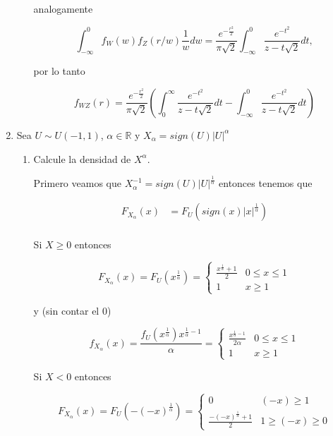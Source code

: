 \documentclass[letterpaper]{article}
\theoremstyle{definition}
\theoremstyle{lemathm}
\theoremstyle{lemademthm}
\newcommand{\R}{\mathbb{R}}
\begin{document}
\begin{enumerate}
\begin{enumerate}
			analogamente

			\[\int_{-\infty}^0 f_W(w)f_Z(r/w)\frac{1}{w}dw = \frac{e^{-\frac{r^2}{2}}}{\pi\sqrt{2}} \int_{-\infty}^0 \frac{e^{-t^2}}{z-t\sqrt{2}}dt,\]

			por lo tanto

			\[f_{WZ}(r) = \frac{e^{-\frac{r^2}{2}}}{\pi\sqrt{2}} \left( \int_{0}^{\infty} \frac{e^{-t^2}}{z-t\sqrt{2}}dt - \int_{-\infty}^0 \frac{e^{-t^2}}{z-t\sqrt{2}}dt \right)\]
		\end{enumerate}

		\item Sea $U \sim U(-1,1)$, $\alpha \in \R$ y $X_\alpha = sign(U)|U|^\alpha$
		
		\begin{enumerate}
			\item Calcule la densidad de $X^\alpha$.
			
			Primero veamos que $X_\alpha^{-1} = sign(U)|U|^{\frac{1}{\alpha}}$ entonces tenemos que

			\begin{align*}
				F_{X_\alpha}(x) &= F_U(sign(x)|x|^{\frac{1}{\alpha}}) \\
			\end{align*}

			Si $X \geq 0$ entonces
			
			\[F_{X_\alpha}(x) = F_U(x^{\frac{1}{\alpha}}) = \left\{\begin{array}{cc}
		
				\frac{x^{\frac{1}{\alpha}} + 1}{2} & 0 \leq x \leq 1\\
				1 & x \geq 1 
			
			\end{array}\right.\]

			y (sin contar el 0)

			\[f_{X_\alpha}(x) = \frac{f_U(x^{\frac{1}{\alpha}})x^{\frac{1}{\alpha}-1}}{\alpha} = \left\{\begin{array}{cc}
	
				\frac{x^{\frac{1}{\alpha}-1}}{2\alpha} & 0 \leq x \leq 1\\
				1 & x \geq 1 
			
			\end{array}\right.\]
			
			Si $X < 0$ entonces

			\[F_{X_\alpha}(x) = F_U(-(-x)^{\frac{1}{\alpha}}) = \left\{\begin{array}{cc}
				
				0 & (-x) \geq 1\\
				\frac{-(-x)^{\frac{1}{\alpha}} + 1}{2} & 1 \geq (-x) \geq 0
			

\end{array}\]
\end{enumerate}
\end{enumerate}
\end{document}
